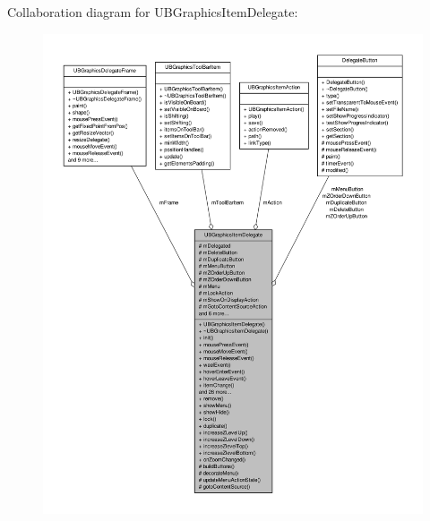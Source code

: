 Collaboration diagram for U\-B\-Graphics\-Item\-Delegate\-:
\nopagebreak
\begin{figure}[H]
\begin{center}
\leavevmode
\includegraphics[width=350pt]{d9/d6d/class_u_b_graphics_item_delegate__coll__graph}
\end{center}
\end{figure}
